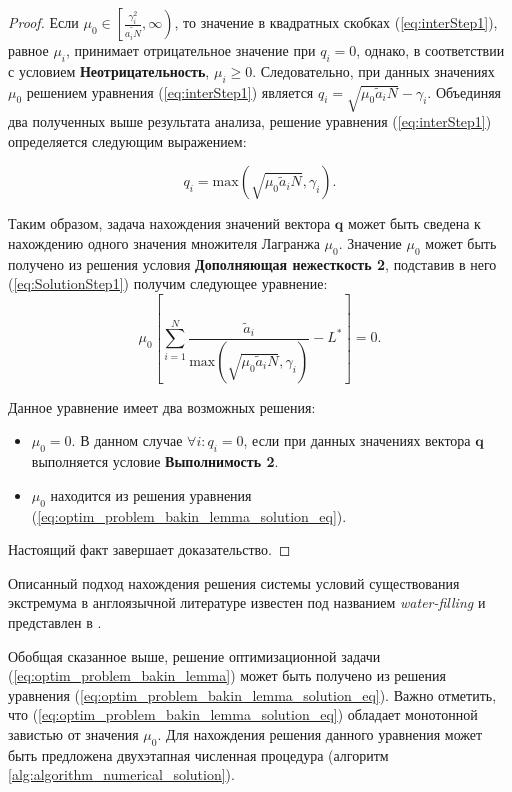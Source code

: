 \begin{proof}
Если $\mu_0 \in \left[\frac{\gamma_i^2}{\tilde{a_i N}},\infty\right)$, то значение в квадратных скобках (\ref{eq:interStep1}), равное $\mu_i$, принимает отрицательное значение при $q_i = 0$, однако, в соответствии с условием \textbf{Неотрицательность}, $\mu_i \geq 0$. Следовательно, при данных значениях $\mu_0$ решением уравнения (\ref{eq:interStep1}) является $q_i = \sqrt{\mu_0 \tilde{a}_i N}-\gamma_i$. Объединяя два полученных выше результата анализа, решение уравнения (\ref{eq:interStep1}) определяется следующим выражением:

\begin{equation}
q_i  = \mathrm{max} \left(\sqrt{\mu_0 \tilde{a}_i N}, \gamma_i \right).
\label{eq:SolutionStep1}
\end{equation}

Таким образом, задача нахождения значений вектора $\boldsymbol{q}$ может быть сведена к нахождению одного значения множителя Лагранжа $\mu_0$. Значение $\mu_0$ может быть получено из решения условия \textbf{Дополняющая нежесткость 2}, подставив в него (\ref{eq:SolutionStep1}) получим следующее уравнение:
$$\mu_0 \left[\sum\limits_{i=1}^{N} {\frac{\tilde{a}_i}{\mathrm{max} \left(\sqrt{\mu_0 \tilde{a}_i N}, \gamma_i\right)}} - L^{*}\right] = 0.$$

Данное уравнение имеет два возможных решения:
\begin{itemize}
	\item $\mu_0 = 0$. В данном случае $\forall i: q_i = 0$, если при данных значениях вектора $\boldsymbol{q}$ выполняется условие \textbf{Выполнимость 2}.
	\item $\mu_0$ находится из решения уравнения (\ref{eq:optim_problem_bakin_lemma_solution_eq}).
\end{itemize}
Настоящий факт завершает доказательство.
\end{proof}

Описанный подход нахождения решения системы условий существования экстремума в англоязычной литературе известен под названием \textit{water-filling} и представлен в \cite{convex_opt}.

Обобщая сказанное выше, решение оптимизационной задачи (\ref{eq:optim_problem_bakin_lemma}) может быть получено из решения уравнения (\ref{eq:optim_problem_bakin_lemma_solution_eq}). Важно отметить, что (\ref{eq:optim_problem_bakin_lemma_solution_eq}) обладает монотонной завистью от значения $\mu_0$. Для нахождения решения данного уравнения может быть предложена двухэтапная численная процедура (алгоритм \ref{alg:algorithm_numerical_solution}).

